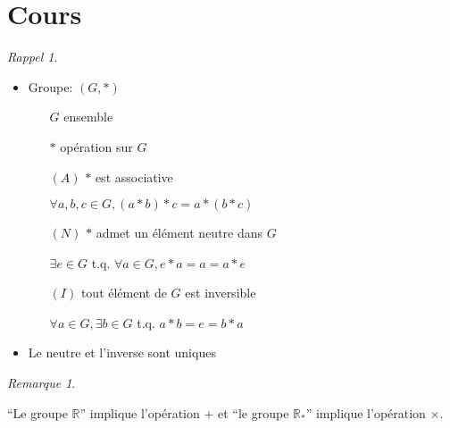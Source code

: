 \documentclass{report}
\newcounter{cours}
\newcommand*{\cours}{\section*{Cours \thecours}\stepcounter{cours}}
\newcommand*{\reels}{\mathbb{R}}
\theoremstyle{definition}
\theoremstyle{remark}
\newtheorem*{rema}{Remarque}
\newtheorem*{rappel}{Rappel}
\begin{document}
	\cours
	\begin{rappel}
		~

		\begin{itemize}[noitemsep]
			\item Groupe: $(G,*)$
			\begin{itemize}
				\item[$G$] ensemble
				\item[$*$] op\'eration sur $G$
				\item[$(A)$] $*$ est associative

				$\forall a,b,c \in G, (a*b)*c=a*(b*c)$
				\item[$(N)$] $*$ admet un \'el\'ement neutre dans $G$

				$\exists e \in G$ t.q. $\forall a \in G, e*a=a=a*e$
				\item[$(I)$] tout \'el\'ement de $G$ est inversible

				$\forall a \in G, \exists b \in G$ t.q. $a*b=e=b*a$
			\end{itemize}
			\item Le neutre et l'inverse sont uniques
		\end{itemize}
	\end{rappel}

	\begin{rema}
		~

		``Le groupe $\reels$'' implique l'op\'eration $+$ et ``le groupe $\reels_*$'' implique l'op\'eration $\times$.
	\end{rema}
\end{document}
